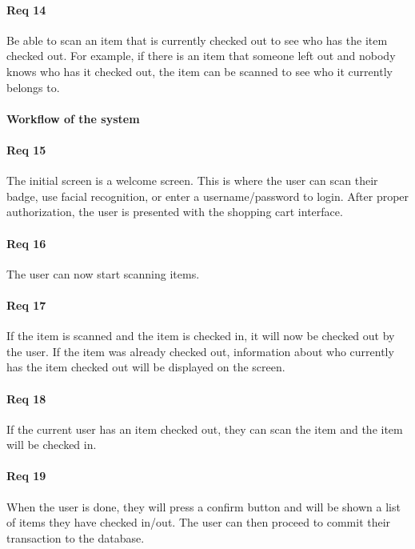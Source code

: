 \documentclass[10pt, onecolumn, twoside, peerreview]{IEEEtran}
\begin{document}
\paragraph*{Req 14} Be able to scan an item that is currently checked out to see who has the item checked out. For example, if there is an
item that someone left out and nobody knows who has it checked out, the item can be scanned to see who it currently
belongs to.\\

\paragraph*{Workflow of the system}

\paragraph*{Req 15} The initial screen is a welcome screen. This is where the user can scan their badge, use facial recognition, or enter a
username/password to login. After proper authorization, the user is presented with the shopping cart interface.\\

\paragraph*{Req 16} The user can now start scanning items.\\

\paragraph*{Req 17} If the item is scanned and the item is checked in, it will now be checked out by the user. If the item was already
checked out, information about who currently has the item checked out will be displayed on the screen.\\

\paragraph*{Req 18} If the current user has an item checked out, they can scan the item and the item will be checked in.\\

\paragraph*{Req 19} When the user is done, they will press a confirm button and will be shown a list of items they have checked in/out. The
user can then proceed to commit their transaction to the database.\\
\end{document}
